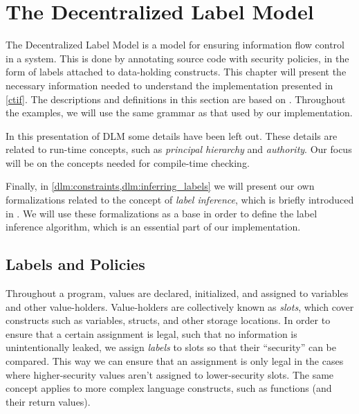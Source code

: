 
\newcommand{\labelof}[1]{\underline{#1}}
\newcommand{\dlmactsfor}{\dlmc{if\_acts\_for}}
\newcommand{\dlmdeclassify}{\dlmc{declassify}}
\newcommand{\dlmpc}{$\underline{pc}$}
\newcommand{\mathcomment}[1]{\color{green!50!black}{#1}}
\newcommand{\ceil}[1]{\lceil#1\rceil}

\chapter{The Decentralized Label Model}\label{dlm}
The Decentralized Label Model \cite{myers1997, myers1998, myers2000} is a model for ensuring information flow control in a system.
This is done by annotating source code with security policies, in the form of labels attached to data-holding constructs.
This chapter will present the necessary information needed to understand the implementation presented in \cref{ctif}.
The descriptions and definitions in this section are based on \cite{myers1997, myers1998, myers2000}.
Throughout the examples, we will use the same grammar as that used by our implementation.

In this presentation of DLM some details have been left out.
These details are related to run-time concepts, such as \emph{principal hierarchy} and \emph{authority}.
Our focus will be on the concepts needed for compile-time checking.

Finally, in \cref{dlm:constraints,dlm:inferring_labels} we will present our own formalizations related to the concept of \emph{label inference}, which is briefly introduced in \cite{myers1997}.
We will use these formalizations as a base in order to define the label inference algorithm, which is an essential part of our implementation.

\section{Labels and Policies}\label{dlm:policies}
Throughout a program, values are declared, initialized, and assigned to variables and other value-holders.
Value-holders are collectively known as \emph{slots}, which cover constructs such as variables, structs, and other storage locations.
In order to ensure that a certain assignment is legal, such that no information is unintentionally leaked, we assign \emph{labels} to slots so that their ``security'' can be compared.
This way we can ensure that an assignment is only legal in the cases where higher-security values aren't assigned to lower-security slots.
The same concept applies to more complex language constructs, such as functions (and their return values).

